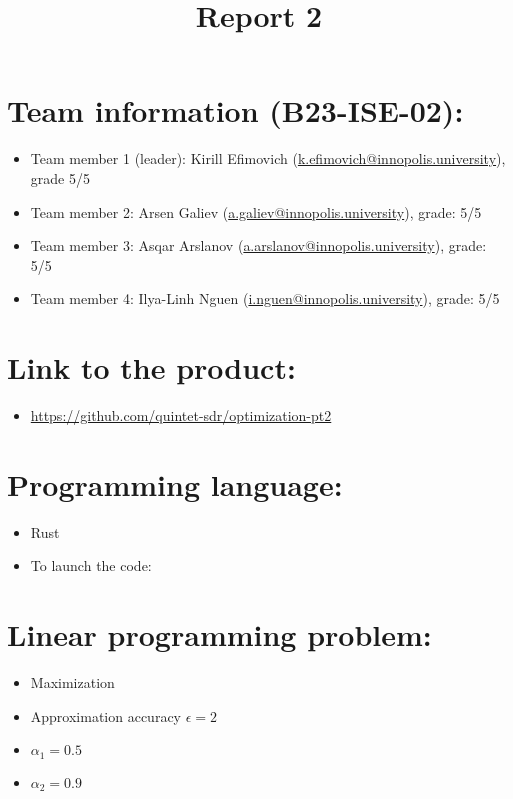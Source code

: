\documentclass{article}
\title{\textbf{Report 2}}
\author{}
\date{}
\begin{document}
\maketitle

\thispagestyle{fancy}

\section*{Team information (B23-ISE-02):}
\begin{itemize}
    \item Team member 1 (leader): Kirill Efimovich (\href{mailto:k.efimovich@innopolis.university}{k.efimovich@innopolis.university}), grade 5/5
    \item Team member 2: Arsen Galiev (\href{mailto:a.galiev@innopolis.university}{a.galiev@innopolis.university}), grade: 5/5
    \item Team member 3: Asqar Arslanov (\href{mailto:a.arslanov@innopolis.university}{a.arslanov@innopolis.university}), grade: 5/5
    \item Team member 4: Ilya-Linh Nguen (\href{mailto:i.nguen@innopolis.university}{i.nguen@innopolis.university}), grade: 5/5
\end{itemize}

\section*{Link to the product:}

\begin{itemize}
    \item \url{https://github.com/quintet-sdr/optimization-pt2}
\end{itemize}

\section*{Programming language:}

\begin{itemize}
    \item Rust
    \item To launch the code: 
\end{itemize}

\section*{Linear programming problem:}

\begin{itemize}
    \item Maximization
    \item Approximation accuracy \(\epsilon = 2\)
    \item  \(\alpha_1 = 0.5\)
    \item  \(\alpha_2 = 0.9\)
\end{itemize}
\end{document}
